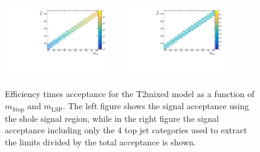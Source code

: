 \begin{figure}[h!]
  \begin{center}
    \includegraphics[width=0.4\textwidth]{figures/jetRanking/T2mixed/eff/T2mixed_merging_9_cats.pdf} ~~
    \includegraphics[width=0.4\textwidth]{figures/susyResults/T2mixed_doubleRatioAcceptance.pdf} \\
    \caption{
      Efficiency times acceptance for the T2mixed model as a function of $m_{\mathrm{Stop}}$ and $m_{\mathrm{LSP}}$.
      The left figure shows the signal acceptance using the shole signal region, 
      while in the right figure the signal acceptance including only the 4 top jet categories used to extract the limits divided by the total acceptance is shown.
    }
    \label{fig:sig-eff-T2mixed}
  \end{center}
\end{figure}

